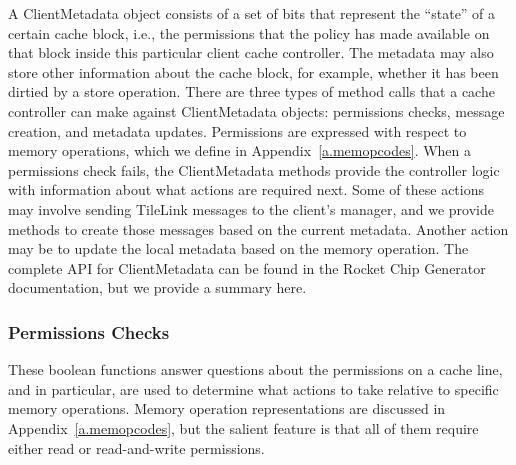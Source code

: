 A ClientMetadata object consists of a set of bits that represent the ``state'' of a certain cache block,
i.e., the permissions that the policy has made available on that block inside this particular client cache controller.
The metadata may also store other information about the cache block,
for example, whether it has been dirtied by a store operation.
There are three types of method calls that a cache controller can make against ClientMetadata objects:
permissions checks, message creation, and metadata updates.
Permissions are expressed with respect to memory operations, which we define in Appendix~\ref{a.memopcodes}.
When a permissions check fails, the ClientMetadata methods provide the controller logic with information about what actions are required next.
Some of these actions may involve sending TileLink messages to the client's manager, and we provide methods to create those messages
based on the current metadata.
Another action may be to update the local metadata based on the memory operation.
The complete API for ClientMetadata can be found in the Rocket Chip Generator~\cite{rocket} documentation, but we provide a summary here.

\subsubsection{Permissions Checks}

These boolean functions answer questions about the permissions on a cache line, and in particular,
are used to determine what actions to take relative to specific memory operations.
Memory operation representations are discussed in Appendix~\ref{a.memopcodes}, but the salient feature is that
all of them require either read or read-and-write permissions.

